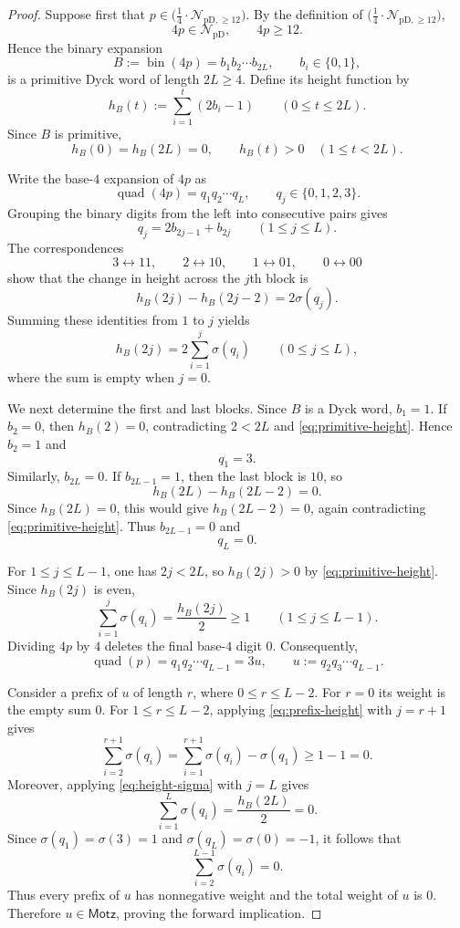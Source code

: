 \documentclass[12pt]{article}
\theoremstyle{plain}
\theoremstyle{definition}
\theoremstyle{plain}
\newcommand{\NpD}{\mathcal{N}_{\mathrm{pD}}}
\newcommand{\Pset}{%
  \bigl(\tfrac{1}{4}\cdot\mathcal{N}_{\mathrm{pD},\geq 12}\bigr)%
}
\begin{document}
\begin{proof}
Suppose first that $p\in\Pset$.  By the definition of $\Pset$,
\[
 4p\in\NpD,\qquad 4p\geq12.
\]
Hence the binary expansion
\[
 B:=\operatorname{bin}(4p)=b_1b_2\cdots b_{2L},
 \qquad b_i\in\{0,1\},
\]
is a primitive Dyck word of length $2L\geq4$.  Define its height function by
\[
 h_B(t):=\sum_{i=1}^{t}(2b_i-1)
 \qquad(0\leq t\leq2L).
\]
Since $B$ is primitive,
\begin{equation}\label{eq:primitive-height}
 h_B(0)=h_B(2L)=0,
 \qquad
 h_B(t)>0\quad(1\leq t<2L).
\end{equation}

Write the base-$4$ expansion of $4p$ as
\[
 \operatorname{quad}(4p)=q_1q_2\cdots q_L,
 \qquad q_j\in\{0,1,2,3\}.
\]
Grouping the binary digits from the left into consecutive pairs gives
\[
 q_j=2b_{2j-1}+b_{2j}
 \qquad(1\leq j\leq L).
\]
The correspondences
\[
 3\longleftrightarrow11,\qquad
 2\longleftrightarrow10,\qquad
 1\longleftrightarrow01,\qquad
 0\longleftrightarrow00
\]
show that the change in height across the $j$th block is
\[
 h_B(2j)-h_B(2j-2)=2\sigma(q_j).
\]
Summing these identities from $1$ to $j$ yields
\begin{equation}\label{eq:height-sigma}
 h_B(2j)=2\sum_{i=1}^{j}\sigma(q_i)
 \qquad(0\leq j\leq L),
\end{equation}
where the sum is empty when $j=0$.

We next determine the first and last blocks.  Since $B$ is a Dyck word,
$b_1=1$.  If $b_2=0$, then $h_B(2)=0$, contradicting
$2<2L$ and \eqref{eq:primitive-height}.  Hence $b_2=1$ and
\[
 q_1=3.
\]
Similarly, $b_{2L}=0$.  If $b_{2L-1}=1$, then the last block is $10$, so
\[
 h_B(2L)-h_B(2L-2)=0.
\]
Since $h_B(2L)=0$, this would give $h_B(2L-2)=0$, again contradicting
\eqref{eq:primitive-height}.  Thus $b_{2L-1}=0$ and
\[
 q_L=0.
\]

For $1\leq j\leq L-1$, one has $2j<2L$, so
$h_B(2j)>0$ by \eqref{eq:primitive-height}.  Since $h_B(2j)$ is even,
\begin{equation}\label{eq:prefix-height}
 \sum_{i=1}^{j}\sigma(q_i)
 =\frac{h_B(2j)}{2}
 \geq1
 \qquad(1\leq j\leq L-1).
\end{equation}
Dividing $4p$ by $4$ deletes the final base-$4$ digit $0$.  Consequently,
\[
 \operatorname{quad}(p)=q_1q_2\cdots q_{L-1}=3u,
 \qquad
 u:=q_2q_3\cdots q_{L-1}.
\]

Consider a prefix of $u$ of length $r$, where $0\leq r\leq L-2$.
For $r=0$ its weight is the empty sum $0$.  For
$1\leq r\leq L-2$, applying \eqref{eq:prefix-height} with $j=r+1$ gives
\begin{equation}\label{eq:motzkin-prefix-nonnegative}
 \sum_{i=2}^{r+1}\sigma(q_i)
 =\sum_{i=1}^{r+1}\sigma(q_i)-\sigma(q_1)
 \geq1-1=0.
\end{equation}
Moreover, applying \eqref{eq:height-sigma} with $j=L$ gives
\[
 \sum_{i=1}^{L}\sigma(q_i)
 =\frac{h_B(2L)}{2}=0.
\]
Since $\sigma(q_1)=\sigma(3)=1$ and
$\sigma(q_L)=\sigma(0)=-1$, it follows that
\[
 \sum_{i=2}^{L-1}\sigma(q_i)=0.
\]
Thus every prefix of $u$ has nonnegative weight and the total weight of $u$
is $0$.  Therefore $u\in\mathsf{Motz}$, proving the forward implication.


\end{proof}
\end{document}
